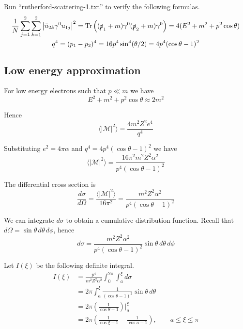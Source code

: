 \documentclass[12pt]{article}
\begin{document}
\noindent
Run ``rutherford-scattering-1.txt'' to verify the following formulas.
\begin{gather*}
\frac{1}{N}\sum_{j=1}^2\sum_{k=1}^2\left|\bar{u}_{2k}\gamma^0 u_{1j}\right|^2
=\mathop{\rm Tr}\left((\slashed{p}_1+m)\gamma^0(\slashed{p}_2+m)\gamma^0\right)
=4(E^2+m^2+p^2\cos\theta)
\\
q^4=(p_1-p_2)^4=16p^4\sin^4(\theta/2)=4p^4(\cos\theta-1)^2
\end{gather*}

\subsection*{Low energy approximation}
For low energy electrons such that $p\ll m$ we have
\begin{equation*}
E^2+m^2+p^2\cos\theta\approx2m^2
\end{equation*}

\noindent
Hence
\begin{equation*}
\langle|\mathcal{M}|^2\rangle=\frac{4m^2Z^2e^4}{q^4}
\end{equation*}

\noindent
Substituting $e^2=4\pi\alpha$ and $q^4=4p^4(\cos\theta-1)^2$ we have
\begin{equation*}
\langle|\mathcal{M}|^2\rangle=\frac{16\pi^2m^2Z^2\alpha^2}{p^4(\cos\theta-1)^2}
\end{equation*}

\noindent
The differential cross section is
\begin{equation*}
\frac{d\sigma}{d\Omega}=\frac{\langle|\mathcal{M}|^2\rangle}{16\pi^2}
=\frac{m^2Z^2\alpha^2}{p^4(\cos\theta-1)^2}
\end{equation*}

\noindent
We can integrate $d\sigma$ to obtain a cumulative distribution function.
Recall that $d\Omega=\sin\theta\,d\theta\,d\phi$, hence
\begin{equation*}
d\sigma=\frac{m^2Z^2\alpha^2}{p^4(\cos\theta-1)^2}\sin\theta\,d\theta\,d\phi
\end{equation*}

\noindent
Let $I(\xi)$ be the following definite integral.
\begin{align*}
I(\xi)&=\frac{p^4}{m^2Z^2\alpha^2}\int_0^{2\pi}\int_a^\xi d\sigma
\\
&=2\pi\int_a^\xi\frac{1}{(\cos\theta-1)^2}\sin\theta\,d\theta
\\
&=2\pi\left(\frac{1}{\cos\theta-1}\right)\bigg|_a^\xi
\\
&=2\pi\left(\frac{1}{\cos\xi-1}-\frac{1}{\cos a-1}\right),\qquad a\le\xi\le\pi
\end{align*}
\end{document}
